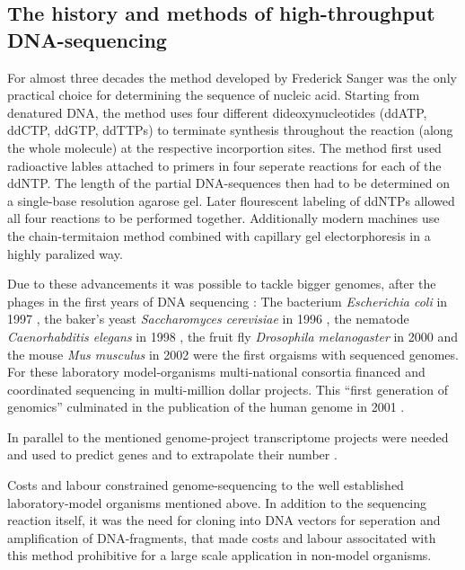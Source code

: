 \subsection{The history and methods of high-throughput DNA-sequencing}
\label{his-seq}

For almost three decades the method developed by Frederick Sanger
\cite{pmid271968} was the only practical choice for determining the
sequence of nucleic acid. Starting from denatured DNA, the method uses
four different dideoxynucleotides (ddATP, ddCTP, ddGTP, ddTTPs) to
terminate synthesis throughout the reaction (along the whole molecule)
at the respective incorportion sites.  The method first used
radioactive lables attached to primers in four seperate reactions for
each of the ddNTP. The length of the partial DNA-sequences then had to
be determined on a single-base resolution agarose gel. Later
flourescent labeling of ddNTPs allowed all four reactions to be
performed together. Additionally modern machines use the
chain-termitaion method combined with capillary gel electorphoresis
\cite{pmid2326186} in a highly paralized way.

Due to these advancements it was possible to tackle bigger genomes,
after the phages in the first years of DNA sequencing
\cite{pmid1264203}: The bacterium \textit{Escherichia coli} in 1997
\cite{pmid9278503}, the baker's yeast \textit{Saccharomyces
  cerevisiae} in 1996 \cite{pmid8849441}, the nematode
\textit{Caenorhabditis elegans} in 1998 \cite{pmid9851916}, the fruit
fly \textit{Drosophila melanogaster} in 2000 \cite{adams2000genome}
and the mouse \textit{Mus musculus} in 2002 \cite{pmid12466850} were
the first orgaisms with sequenced genomes. For these laboratory
model-organisms multi-national consortia financed and coordinated
sequencing in multi-million dollar projects. This ``first generation
of genomics'' culminated in the publication of the human genome in
2001 \cite{pmid11181995}.

In parallel to the mentioned genome-project transcriptome projects
were needed and used to predict genes and to extrapolate their number
\cite{pmid7920649}.

Costs and labour constrained genome-sequencing to the well established
laboratory-model organisms mentioned above. In addition to the
sequencing reaction itself, it was the need for cloning into DNA
vectors for seperation and amplification of DNA-fragments, that made
costs and labour associtated with this method prohibitive for a large
scale application in non-model organisms.

